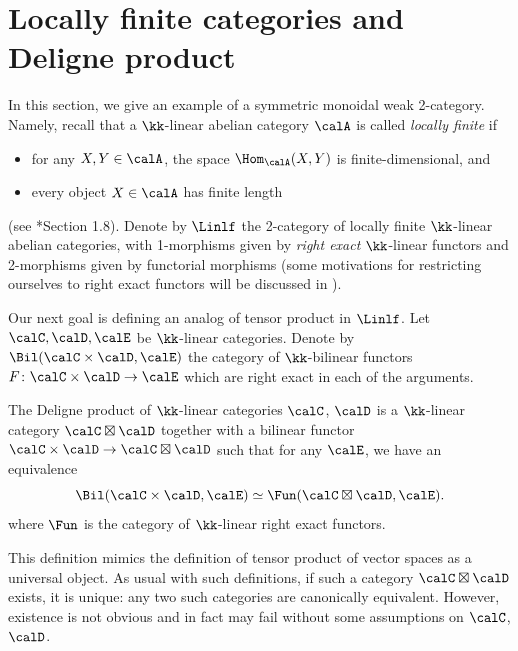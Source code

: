 \section{Locally finite categories and Deligne product}
\label{s:deligne-product}
In this section, we give an example of a symmetric monoidal weak 2-category.
Namely, recall that a $\kk$-linear abelian category $\calA$ is called
\emph{locally finite} if
\begin{itemize}
    \item for any $X,Y\in \calA$, the space $\Hom_{\calA}(X,Y)$ is
      finite-dimensional, and
    \item every object $X\in \calA$ has finite length
\end{itemize}
(see *{Section 1.8}). Denote by $\Linlf$ the 2-category
of locally finite $\kk$-linear abelian categories, with 1-morphisms given by
\emph{right exact} $\kk$-linear functors and 2-morphisms given by functorial
morphisms (some motivations for restricting ourselves to right exact
functors will be discussed in ). %


Our next goal is defining an analog of tensor product in $\Linlf$.
Let $\calC, \calD, \calE$ be $\kk$-linear categories. Denote by
$\Bil(\calC\times\calD, \calE)$ the category of $\kk$-bilinear functors $F\colon
\calC\times\calD\to \calE$ which are right exact in each of the arguments.

\begin{definition}\label{d:deligne-product}
  The Deligne product of $\kk$-linear categories $\calC$, $\calD$ is a
  $\kk$-linear category $\calC\boxtimes \calD$ together with a bilinear functor
  $\calC\times\calD\to \calC\boxtimes\calD$ such that for any $\calE$, we have
  an equivalence
  $$
    \Bil(\calC\times\calD, \calE)\simeq \Fun(\calC\boxtimes\calD, \calE).
  $$
  where $\Fun$ is the category of $\kk$-linear right exact functors.
\end{definition}
This definition mimics the definition of tensor product of vector spaces as a
universal object. As usual with such definitions, if such a category
$\calC\boxtimes\calD$ exists, it is unique: any two such categories are
canonically equivalent. However, existence is not obvious and in fact may fail
without some assumptions on $\calC$, $\calD$.

